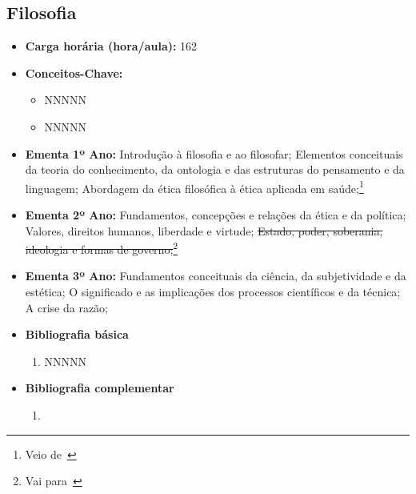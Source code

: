 \documentclass[11pt,fleqn]{book} %
\newcommand{\VER}[1]{\begingroup\color{red}#1\endgroup}
\begin{document}
\subsection{Filosofia}\label{disc:filosofia}
\begin{itemize}
	\item \textbf{Carga horária (hora/aula):} 162
	\item \textbf{Conceitos-Chave:}
	\begin{itemize}
		\item NNNNN
		\item NNNNN
	\end{itemize}
	\item \textbf{Ementa 1º Ano:} 
	Introdução à filosofia e ao filosofar;
	Elementos conceituais da teoria do conhecimento, da ontologia e das estruturas do pensamento e da linguagem;
	\VER{Abordagem da ética filosófica à ética aplicada em saúde;}\footnote{Veio de~} 
	\item \textbf{Ementa 2º Ano:} 	
	Fundamentos, concepções e relações da ética e da política; 
	Valores, direitos humanos, liberdade e virtude;
	\sout{Estado, poder, soberania, ideologia e formas de governo;}\footnote{Vai para~}
	\item \textbf{Ementa 3º Ano:} 
	Fundamentos conceituais da ciência, da subjetividade e da estética;
	O significado e as implicações dos processos científicos e da técnica; 
	A crise da razão;
	\item \textbf{Bibliografia básica}
	\begin{enumerate}
		\item NNNNN
	\end{enumerate}
	\item \textbf{Bibliografia complementar}
	\begin{enumerate}
		\item 
	\end{enumerate}	
\end{itemize}

\newpage
\end{document}
